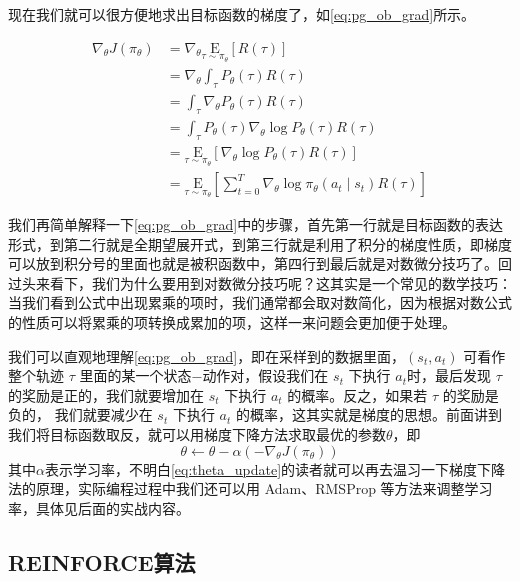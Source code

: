 现在我们就可以很方便地求出目标函数的梯度了，如\eqref{eq:pg_ob_grad}所示。

\begin{equation}
    \label{eq:pg_ob_grad}
    \begin{aligned}
    \nabla_\theta J\left(\pi_\theta\right) &=\nabla_\theta \underset{\tau \sim \pi_\theta}{\mathrm{E}}[R(\tau)] \\
    &=\nabla_\theta \int_\tau P_{\theta}(\tau) R(\tau) \\
    &=\int_\tau \nabla_\theta P_{\theta}(\tau) R(\tau) \\
    &=\int_\tau P_{\theta}(\tau) \nabla_\theta \log P_{\theta}(\tau) R(\tau) \\
    &=\underset{\tau \sim \pi_\theta}{\mathrm{E}}\left[\nabla_\theta \log P_{\theta}(\tau) R(\tau)\right]\\
    &= \underset{\tau \sim \pi_\theta}{\mathrm{E}}\left[\sum_{t=0}^T \nabla_\theta \log \pi_\theta\left(a_t \mid s_t\right) R(\tau)\right]
    \end{aligned}
\end{equation}

我们再简单解释一下\eqref{eq:pg_ob_grad}中的步骤，首先第一行就是目标函数的表达形式，到第二行就是全期望展开式，到第三行就是利用了积分的梯度性质，即梯度可以放到积分号的里面也就是被积函数中，第四行到最后就是对数微分技巧了。回过头来看下，我们为什么要用到对数微分技巧呢？这其实是一个常见的数学技巧：当我们看到公式中出现累乘的项时，我们通常都会取对数简化，因为根据对数公式的性质可以将累乘的项转换成累加的项，这样一来问题会更加便于处理。

我们可以直观地理解\eqref{eq:pg_ob_grad}，即在采样到的数据里面，$(s_t,a_t)$ 可看作整个轨迹 $\tau$ 里面的某一个状态$-$动作对，假设我们在 $s_t$ 下执行 $a_t$时，最后发现 $\tau$ 的奖励是正的，我们就要增加在 $s_t$ 下执行 $a_t$ 的概率。反之，如果若 $\tau$ 的奖励是负的， 我们就要减少在 $s_t$ 下执行 $a_t$ 的概率，这其实就是梯度的思想。前面讲到我们将目标函数取反，就可以用梯度下降方法求取最优的参数$\theta$，即
\begin{equation}
    \label{eq:theta_update}
    \theta \leftarrow \theta - \alpha (-\nabla_\theta J\left(\pi_\theta\right))
\end{equation}
其中$\alpha$表示学习率，不明白\eqref{eq:theta_update}的读者就可以再去温习一下梯度下降法的原理，实际编程过程中我们还可以用 Adam、RMSProp 等方法来调整学习率，具体见后面的实战内容。

\subsection{REINFORCE算法}

